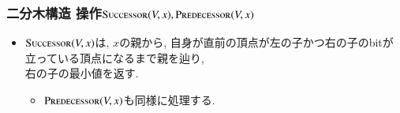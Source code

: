\documentclass[main]{subfiles}
\begin{document}
\begin{frame}\frametitle{二分木構造 操作{\small $\mathrm{\text{S\textsc{uccessor}}}(V,x), \mathrm{\text{P\textsc{redecessor}}}(V,x)$}}
\begin{itemize}
\item $\mathrm{\text{S\textsc{uccessor}}}(V,x)$は, $x$の親から, 自身が直前の頂点が左の子かつ右の子のbitが立っている頂点になるまで親を辿り, \\右の子の最小値を返す. 
\begin{itemize}
\item $\mathrm{\text{P\textsc{redecessor}}}(V,x)$も同様に処理する.
\end{itemize}
\end{itemize}
\begin{columns}[t]
\begin{column}{0.45\linewidth} \end{column}
\begin{column}{0.54\linewidth} \end{column}
\end{columns}

\end{frame}
\end{document}
